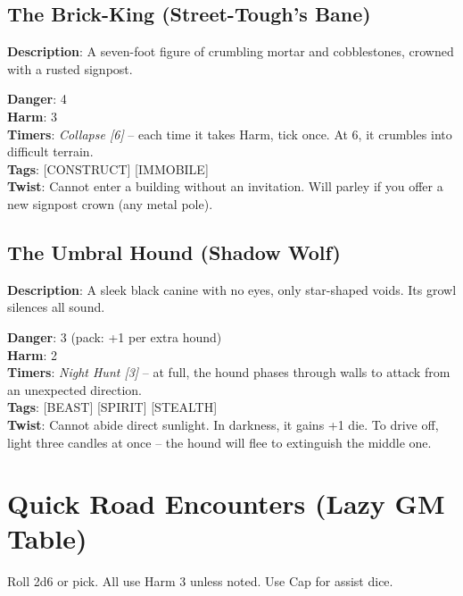 \subsection*{The Brick-King (Street-Tough's Bane)}

\noindent\textbf{Description}: A seven-foot figure of crumbling mortar and cobblestones, crowned with a rusted signpost.

\noindent\textbf{Danger}: 4\\
\textbf{Harm}: 3\\
\textbf{Timers}: \emph{Collapse [6]} -- each time it takes Harm, tick once. At 6, it crumbles into difficult terrain.\\
\textbf{Tags}: [CONSTRUCT] [IMMOBILE]\\
\textbf{Twist}: Cannot enter a building without an invitation. Will parley if you offer a new signpost crown (any metal pole).


\subsection*{The Umbral Hound (Shadow Wolf)}

\noindent\textbf{Description}: A sleek black canine with no eyes, only star-shaped voids. Its growl silences all sound.

\noindent\textbf{Danger}: 3 (pack: +1 per extra hound)\\
\textbf{Harm}: 2\\
\textbf{Timers}: \emph{Night Hunt [3]} -- at full, the hound phases through walls to attack from an unexpected direction.\\
\textbf{Tags}: [BEAST] [SPIRIT] [STEALTH]\\
\textbf{Twist}: Cannot abide direct sunlight. In darkness, it gains +1 die. To drive off, light three candles at once -- the hound will flee to extinguish the middle one.


\section*{Quick Road Encounters (Lazy GM Table)}
\noindent Roll 2d6 or pick. All use Harm 3 unless noted. Use Cap for assist dice.


